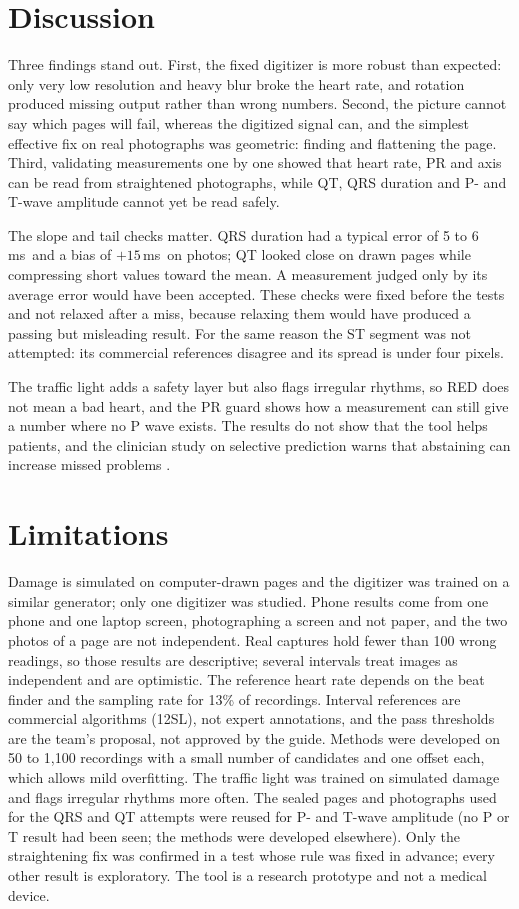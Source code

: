 \documentclass[11pt,a4paper]{article}
\newcommand{\ms}{\,ms}
\begin{document}
\section{Discussion}
Three findings stand out. First, the fixed digitizer is more robust than expected: only very low resolution and heavy blur broke the heart rate, and rotation produced missing output rather than wrong numbers. Second, the picture cannot say which pages will fail, whereas the digitized signal can, and the simplest effective fix on real photographs was geometric: finding and flattening the page. Third, validating measurements one by one showed that heart rate, PR and axis can be read from straightened photographs, while QT, QRS duration and P- and T-wave amplitude cannot yet be read safely.

The slope and tail checks matter. QRS duration had a typical error of 5 to 6\ms\ and a bias of $+15$\ms\ on photos; QT looked close on drawn pages while compressing short values toward the mean. A measurement judged only by its average error would have been accepted. These checks were fixed before the tests and not relaxed after a miss, because relaxing them would have produced a passing but misleading result. For the same reason the ST segment was not attempted: its commercial references disagree and its spread is under four pixels.

The traffic light adds a safety layer but also flags irregular rhythms, so RED does not mean a bad heart, and the PR guard shows how a measurement can still give a number where no P wave exists. The results do not show that the tool helps patients, and the clinician study on selective prediction warns that abstaining can increase missed problems \citep{ref26}.

\section{Limitations}
Damage is simulated on computer-drawn pages and the digitizer was trained on a similar generator; only one digitizer was studied. Phone results come from one phone and one laptop screen, photographing a screen and not paper, and the two photos of a page are not independent. Real captures hold fewer than 100 wrong readings, so those results are descriptive; several intervals treat images as independent and are optimistic. The reference heart rate depends on the beat finder and the sampling rate for 13\% of recordings. Interval references are commercial algorithms (12SL), not expert annotations, and the pass thresholds are the team's proposal, not approved by the guide. Methods were developed on 50 to 1,100 recordings with a small number of candidates and one offset each, which allows mild overfitting. The traffic light was trained on simulated damage and flags irregular rhythms more often. The sealed pages and photographs used for the QRS and QT attempts were reused for P- and T-wave amplitude (no P or T result had been seen; the methods were developed elsewhere). Only the straightening fix was confirmed in a test whose rule was fixed in advance; every other result is exploratory. The tool is a research prototype and not a medical device.
\end{document}
